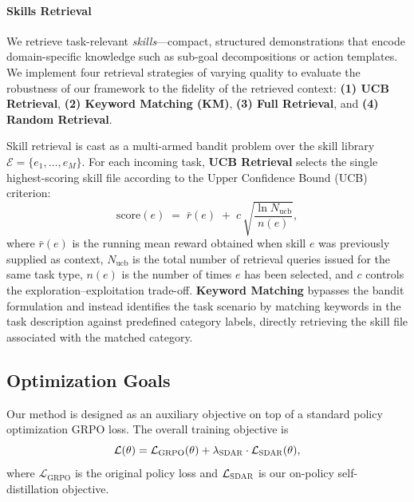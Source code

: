 \documentclass{article} %
\newcommand{\methodname}{\textsc{SDAR}\xspace}
\begin{document}
\paragraph{Skills Retrieval} We retrieve task-relevant \emph{skills}---compact, structured demonstrations that encode domain-specific knowledge such as sub-goal decompositions or action templates. 
We implement four retrieval strategies of varying quality to evaluate the robustness of our framework to the fidelity of the retrieved context: \textbf{(1) UCB Retrieval}, \textbf{(2) Keyword Matching (KM)}, \textbf{(3) Full Retrieval}, and \textbf{(4) Random Retrieval}.

Skill retrieval is cast as a multi-armed bandit problem over the skill library $\mathcal{E} = \{e_1, \dots, e_M\}$. For each incoming task, \textbf{UCB Retrieval} selects the single highest-scoring skill file according to the Upper Confidence Bound (UCB) criterion:
%
\begin{equation}
    \mathrm{score}(e) \;=\; \bar{r}(e) \;+\; c\,\sqrt{\frac{\ln N_{\mathrm{ucb}}}{n(e)}},
\end{equation}
%
where $\bar{r}(e)$ is the running mean reward obtained when skill $e$ was previously supplied as context, $N_{\mathrm{ucb}}$ is the total number of retrieval queries issued for the same task type, $n(e)$ is the number of times $e$ has been selected, and $c$ controls the exploration--exploitation trade-off.
\textbf{Keyword Matching} bypasses the bandit formulation and instead identifies the task
  scenario by matching keywords in the task description against predefined category labels,
  directly retrieving the skill file associated with the matched category.

\subsection{Optimization Goals}
\label{sec:opsd}
Our method is designed as an auxiliary objective on top of a standard policy optimization GRPO loss. The overall training objective is
\[
\mathcal{L}(\theta)
=
\mathcal{L}_{\text{GRPO}}(\theta)
+
\lambda_{\text{\methodname}} \cdot \mathcal{L}_{\text{\methodname}}(\theta),
\]
where $\mathcal{L}_{\text{GRPO}}$ is the original policy loss and
$\mathcal{L}_{\text{\methodname}}$ is our on-policy self-distillation objective.
\end{document}
